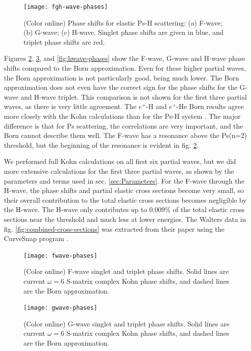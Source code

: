 \documentclass[preprint,showpacs,preprintnumbers,amsmath,amssymb]{revtex4}
\begin{document}
\begin{figure}[H]
	\centering
	\texttt{[image: fgh-wave-phases]}
	\caption{(Color online) Phase shifts for elastic Ps-H scattering: (a) F-wave; (b) G-wave; (c) H-wave. Singlet phase shifts are given in blue, and triplet phase shifts are red.}	
	\label{fig:fgh-wave-phases}
\end{figure}

Figures \ref{fig:fwave-phases}, \ref{fig:gwave-phases}, and \ref{fig:hwave-phases} show the F-wave, G-wave and H-wave phase shifts compared to the Born approximation. Even for these higher partial waves, the Born approximation is not particularly good, being much lower. The Born approximation does not even have the correct sign for the phase shifts for the G-wave and H-wave triplet. This comparison is not shown for the first three partial waves, as there is very little agreement. The $e^+$-H and $e^+$-He Born results agree more closely with the Kohn calculations than for the Ps-H system \cite{?}. The major difference is that for Ps scattering, the correlations are very important, and the Born cannot describe them well. The F-wave has a resonance above the Ps(n=2) threshold, but the beginning of the resonance is evident in fig. \ref{fig:fwave-phases}.

We performed full Kohn calculations on all first six partial waves, but we did more extensive calculations for the first three partial waves, as shown by the parameters and terms used in sec. \ref{sec:Parameters}. For the F-wave through the H-wave, the phase shifts and partial elastic cross sections become very small, so their overall contribution to the total elastic cross sections becomes negligible by the H-wave. The H-wave only contributes up to 0.009\% of the total elastic cross sections near the threshold and much less at lower energies. The Walters data in fig. \ref{fig:combined-cross-sections} was extracted from their paper \cite{Walters2004} using the CurveSnap program \cite{CurveSnap}.

\begin{figure}[H]
	\centering
	\texttt{[image: fwave-phases]}
	\caption{(Color online) F-wave singlet and triplet phase shifts. Solid lines are current $\omega = 6$ S-matrix complex Kohn phase shifts, and dashed lines are the Born approximation.}
	\label{fig:fwave-phases}
\end{figure}

\begin{figure}[H]
	\centering
	\texttt{[image: gwave-phases]}
	\caption{(Color online) G-wave singlet and triplet phase shifts. Solid lines are current $\omega = 6$ S-matrix complex Kohn phase shifts, and dashed lines are the Born approximation.}
	\label{fig:gwave-phases}
\end{figure}
\end{document}
